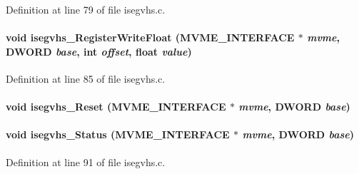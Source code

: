 Definition at line 79 of file isegvhs.c.
\paragraph[{isegvhs\_\-RegisterWriteFloat}]{\setlength{\rightskip}{0pt plus 5cm}void isegvhs\_\-RegisterWriteFloat ({\bf MVME\_\-INTERFACE} $\ast$ {\em mvme}, \/  {\bf DWORD} {\em base}, \/  int {\em offset}, \/  float {\em value})}\hfill\label{isegvhsdrv_8h_af4c3b3ae7b017ef10521d9c1e2f8b38f}


Definition at line 85 of file isegvhs.c.
\paragraph[{isegvhs\_\-Reset}]{\setlength{\rightskip}{0pt plus 5cm}void isegvhs\_\-Reset ({\bf MVME\_\-INTERFACE} $\ast$ {\em mvme}, \/  {\bf DWORD} {\em base})}\hfill\label{isegvhsdrv_8h_ac41d0e96dce15aa5497cd58ed2863638}
\paragraph[{isegvhs\_\-Status}]{\setlength{\rightskip}{0pt plus 5cm}void isegvhs\_\-Status ({\bf MVME\_\-INTERFACE} $\ast$ {\em mvme}, \/  {\bf DWORD} {\em base})}\hfill\label{isegvhsdrv_8h_a2ba6c21fb7b196351e5294280e7662d2}


Definition at line 91 of file isegvhs.c.